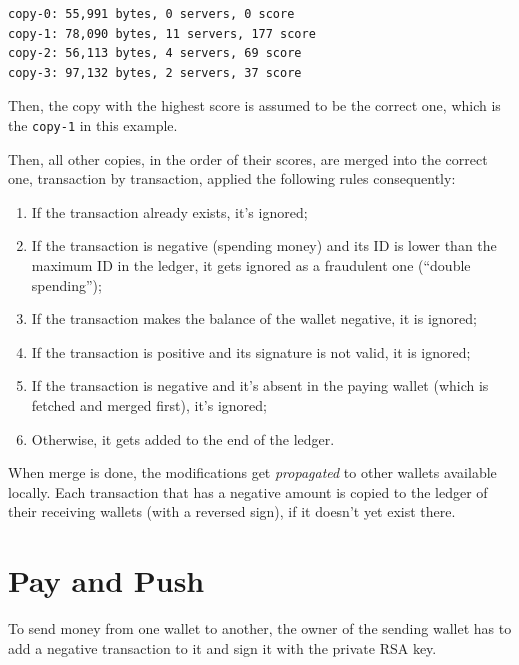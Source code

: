 \documentclass[11pt,oneside]{article}
\newcommand\dd[1]{\colorbox{gray!30}{\texttt{#1}}}
\begin{document}
\begin{verbatim}
copy-0: 55,991 bytes, 0 servers, 0 score
copy-1: 78,090 bytes, 11 servers, 177 score
copy-2: 56,113 bytes, 4 servers, 69 score
copy-3: 97,132 bytes, 2 servers, 37 score
\end{verbatim}

Then, the copy with the highest score is assumed to be the correct one,
which is the \dd{copy-1} in this example.

Then, all other copies, in the order of their scores, are merged into the
correct one, transaction by transaction, applied the following rules
consequently:

\begin{enumerate}
\item If the transaction already exists, it's ignored;
\item If the transaction is negative (spending money) and its ID is lower than
the maximum ID in the ledger, it gets ignored as a fraudulent one (``double spending'');
\item If the transaction makes the balance of the wallet negative, it is ignored;
\item If the transaction is positive and its signature is not valid, it is ignored;
\item If the transaction is negative and it's absent in the paying wallet
(which is fetched and merged first), it's ignored;
\item Otherwise, it gets added to the end of the ledger.
\end{enumerate}

When merge is done, the modifications get \emph{propagated} to other wallets
available locally. Each transaction that has a negative amount is
copied to the ledger of their receiving wallets (with a reversed sign),
if it doesn't yet exist there.

\section{Pay and Push}

To send money from one wallet to another, the owner of the sending wallet
has to add a negative transaction to it and sign it with the private RSA key.
\end{document}
